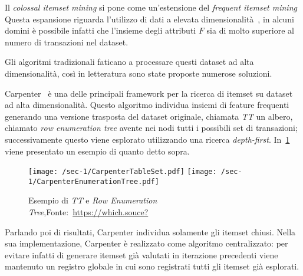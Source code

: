 
Il \textit{colossal itemset mining} si pone come un'estensione del \textit{frequent itemset mining}
Questa espansione riguarda l'utilizzo di dati
a elevata dimensionalità~\cite{zhu2007mining}, in alcuni domini è possibile infatti che l'insieme degli attributi \(F\) sia di molto superiore al
numero di transazioni nel dataset.

Gli algoritmi tradizionali faticano a processare questi dataset ad alta dimensionalità, così in
letteratura sono state proposte numerose soluzioni.

Carpenter~\cite{DBLP:conf/kdd/PanCTYZ03} è una delle principali framework per
la ricerca di itemset su dataset ad alta dimensionalità.
Questo algoritmo individua insiemi di feature frequenti generando una versione trasposta del dataset originale, chiamata \textit{TT} un albero, chiamato \textit{row enumeration tree} avente nei nodi tutti i possibili set di transazioni;
successivamente questo viene esplorato utilizzando una ricerca \textit{depth-first}.
In~\cref{fig:chap-3:carpenter} viene presentato un esempio di quanto detto sopra.

\begin{figure}
  \centering
  \texttt{[image: /sec-1/CarpenterTableSet.pdf]}
  \texttt{[image: /sec-1/CarpenterEnumerationTree.pdf]}
  \caption{Esempio di \textit{TT} e \textit{Row Enumeration Tree},Fonte:~\url{https://which.souce?}}%
  \label{fig:chap-3:carpenter}
\end{figure}

Parlando poi di risultati, Carpenter individua solamente gli itemset chiusi.
Nella sua implementazione, Carpenter è realizzato come algoritmo centralizzato: per evitare infatti
di generare itemset già valutati in iterazione precedenti viene mantenuto un registro globale in
cui sono registrati tutti gli itemset già esplorati.

